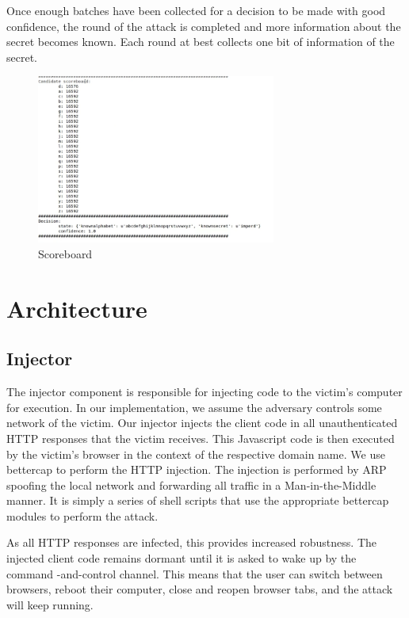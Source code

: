Once enough batches have been collected for a decision to be made with good
confidence, the round of the attack is completed and more information about the
secret becomes known. Each round at best collects one bit of information of the
secret.


\begin{figure}[H] \caption{Scoreboard} \centering
\includegraphics[width=0.7\textwidth]{diagrams/scoreboard.png}\end{figure}

\section{Architecture}\label{sec:architecture}


\subsection{Injector}
The injector component is responsible for injecting code to the victim's
computer for execution. In our implementation, we assume the adversary controls
some network of the victim. Our injector injects the client code in all
unauthenticated HTTP responses that the victim receives. This Javascript code
is then executed by the victim's browser in the context of the respective
domain name. We use bettercap \cite{bettercap}  to perform the HTTP
injection. The injection is performed by ARP spoofing the local network and
forwarding all traffic in a Man-in-the-Middle manner. It is simply a series of
shell scripts that use the appropriate bettercap modules to perform the attack.

As all HTTP responses are infected, this provides increased robustness.
The injected client code remains dormant until it is asked to wake
up by the command -and-control channel. This means that the user can switch
between browsers, reboot their computer, close and reopen browser tabs, and the
attack will keep running.

